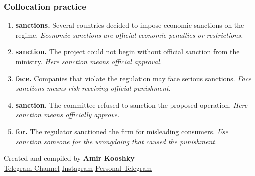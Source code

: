 \documentclass[11pt]{article}
\begin{document}
\subsubsection{Collocation practice}
\begin{enumerate}
  \item \textbf{sanctions.} Several countries decided to impose economic sanctions on the regime. \emph{Economic sanctions are official economic penalties or restrictions.}
  \item \textbf{sanction.} The project could not begin without official sanction from the ministry. \emph{Here sanction means official approval.}
  \item \textbf{face.} Companies that violate the regulation may face serious sanctions. \emph{Face sanctions means risk receiving official punishment.}
  \item \textbf{sanction.} The committee refused to sanction the proposed operation. \emph{Here sanction means officially approve.}
  \item \textbf{for.} The regulator sanctioned the firm for misleading consumers. \emph{Use sanction someone for the wrongdoing that caused the punishment.}
\end{enumerate}

\vfill
\begin{center}
\small\color{Muted} Created and compiled by \textbf{Amir Kooshky}\\
\href{https://t.me/KooshkyTOEFL}{Telegram Channel}\quad\textbullet\quad
\href{https://www.instagram.com/kooshkytoefl}{Instagram}\quad\textbullet\quad
\href{https://t.me/KooshkyTOEFL\_pv}{Personal Telegram}
\end{center}
\end{document}
